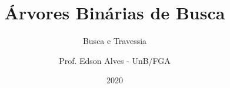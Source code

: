 \title{Árvores Binárias de Busca}
\subtitle{Busca e Travessia}
\author{Prof. Edson Alves - UnB/FGA}
\date{2020}
